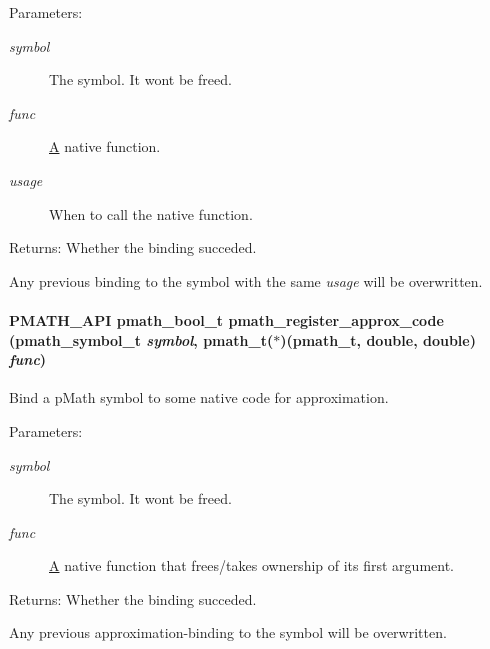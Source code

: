 \begin{Desc}
\item[Parameters:]
\begin{description}
\item[{\em symbol}]The symbol. It wont be freed. \item[{\em func}]\hyperlink{class_a}{A} native function. \item[{\em usage}]When to call the native function. \end{description}
\end{Desc}
\begin{Desc}
\item[Returns:]Whether the binding succeded.\end{Desc}
Any previous binding to the symbol with the same {\em usage\/} will be overwritten. \hypertarget{group__symbols_gfb4f09c196d889a710c73d917ea0c12a}{
\paragraph[{pmath\_\-register\_\-approx\_\-code}]{\setlength{\rightskip}{0pt plus 5cm}PMATH\_\-API {\bf pmath\_\-bool\_\-t} pmath\_\-register\_\-approx\_\-code ({\bf pmath\_\-symbol\_\-t} {\em symbol}, \/  {\bf pmath\_\-t}($\ast$)({\bf pmath\_\-t}, double, double) {\em func})}\hfill}
\label{group__symbols_gfb4f09c196d889a710c73d917ea0c12a}


Bind a pMath symbol to some native code for approximation. 

\begin{Desc}
\item[Parameters:]
\begin{description}
\item[{\em symbol}]The symbol. It wont be freed. \item[{\em func}]\hyperlink{class_a}{A} native function that frees/takes ownership of its first argument. \end{description}
\end{Desc}
\begin{Desc}
\item[Returns:]Whether the binding succeded.\end{Desc}
Any previous approximation-binding to the symbol will be overwritten.

